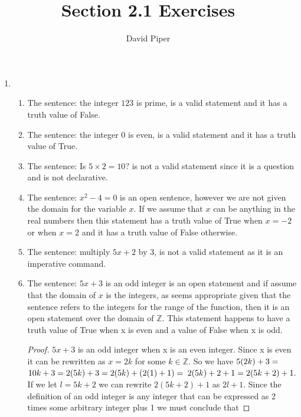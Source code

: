 \documentclass[12pt]{article}
\title{Section 2.1 Exercises}
\author{David Piper}
\makeatletter
\newcommand*{\arabicodd}[1]{%
  \expandafter\@arabicodd\csname c@#1\endcsname
}
\newcommand*{\@arabicodd}[1]{%
  \@arabic{\numexpr(#1)*2-1\relax}%
}
\makeatother
\begin{document}
  \maketitle

  \begin{enumerate}[label=2.\arabicodd*]
    \item
      \begin{enumerate}[label=(\alph*)]
        \item The sentence: the integer $123$ is prime, is a
              valid statement and it has a truth value of False.
        \item The sentence: the integer $0$ is even, is a
              valid statement and it has a truth value of True.
        \item The sentence:  Is $5 \times 2 = 10?$ is not a valid
              statement since it is a question and is not declarative.
        \item The sentence:  $x^2 - 4 = 0$ is an open sentence, however we are
              not given the domain for the variable $x.$ If we assume that $x$
              can be anything in the real numbers then this statement has
              a truth value of True when $x=-2$ or when $x=2$ and it has a
              truth value of False otherwise.
        \item The sentence: multiply $5x + 2$ by $3$, is not a valid statement
              as it is an imperative command.
        \item The sentence:  $5x + 3$ is an odd integer is an open statement
              and if assume that the domain of $x$ is the integers, as seems
              appropriate given that the sentence refers to the integers for
              the range of the function, then it is an open statement over the
              domain of $\mathbb{Z}.$ This statement happens to have a truth
              value of True when x is even and a value of False when x is odd.
              \begin{proof}
                $5x + 3$ is an odd integer when x is an even integer.
                Since x is even it can be rewritten as $x=2k$ for some
                $k \in \mathbb{Z}.$ So we have $5\qty(2k)+3=$
                $10k+3=2\qty(5k)+3=2\qty(5k)+\qty(2\qty(1)+1)=$
                $2\qty(5k)+2+1=2\qty(5k+2)+1.$ If we let $l=5k+2$ we
                can rewrite $2(5k+2) + 1$ as $2l+1$. Since the definition
                of an odd integer is any integer that can be expressed as
                2 times some arbitrary integer plus 1 we must conclude that

\end{proof}
\end{enumerate}
\end{enumerate}
\end{document}
